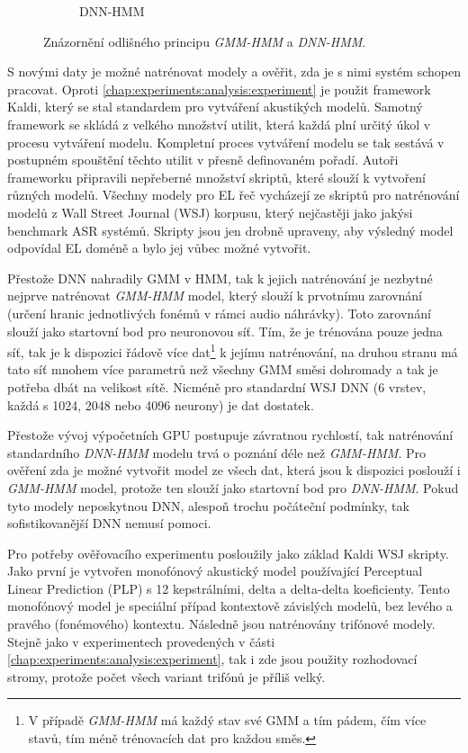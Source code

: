 \begin{figure}[htpb]
\begin{subfigure}[b]{0.4\textwidth}
    \caption{DNN-HMM}
    \label{fig:experiments:normalization:hmm:dnn}
  \end{subfigure}
  \caption{Znázornění odlišného principu \textit{GMM-HMM} a \textit{DNN-HMM}.}
  \label{fig:experiments:normalization:hmm}
\end{figure}

S novými daty je možné natrénovat modely a ověřit, zda je s nimi systém schopen pracovat. Oproti \ref{chap:experiments:analysis:experiment} je použit framework Kaldi, který se stal standardem pro vytváření akustikých modelů. Samotný framework se skládá z velkého množství utilit, která každá plní určitý  úkol v procesu vytváření modelu. Kompletní proces vytváření modelu se tak sestává v postupném spouštění těchto utilit v přesně definovaném pořadí. Autoři frameworku připravili nepřeberné množství skriptů, které slouží k vytvoření různých modelů. Všechny modely pro EL řeč vycházejí ze skriptů pro natrénování modelů z Wall Street Journal (WSJ) korpusu, který nejčastěji jako jakýsi benchmark ASR systémů. Skripty jsou jen drobně upraveny, aby výsledný model odpovídal EL doméně a bylo jej vůbec možné vytvořit.

Přestože DNN nahradily GMM v HMM, tak k jejich natrénování je nezbytné nejprve natrénovat \textit{GMM-HMM} model, který slouží k prvotnímu zarovnání (určení hranic jednotlivých fonémů v rámci audio náhrávky). Toto zarovnání slouží jako startovní bod pro neuronovou síť. Tím, že je trénována pouze jedna síť, tak je k dispozici řádově více dat\footnote{V případě \textit{GMM-HMM} má každý stav své GMM a tím pádem, čím více stavů, tím méně trénovacích dat pro každou směs.} k jejímu natrénování, na druhou stranu má tato síť mnohem více parametrů než všechny GMM směsi dohromady a tak je potřeba dbát na velikost sítě. Nicméně pro standardní WSJ DNN (6 vrstev, každá s 1024, 2048 nebo 4096 neurony) je dat dostatek.

Přestože vývoj výpočetních GPU postupuje závratnou rychlostí, tak natrénování standardního \textit{DNN-HMM} modelu trvá o poznání déle než \textit{GMM-HMM}. Pro ověření zda je možné vytvořit model ze všech dat, která jsou k dispozici poslouží i \textit{GMM-HMM} model, protože ten slouží jako startovní bod pro \textit{DNN-HMM}. Pokud tyto modely neposkytnou DNN, alespoň trochu  počáteční podmínky, tak sofistikovanější DNN nemusí pomoci.

Pro potřeby ověřovacího experimentu posloužily jako základ Kaldi WSJ skripty. Jako první je vytvořen monofónový akustický model používající Perceptual Linear Prediction (PLP) s 12 kepstrálními, delta a delta-delta koeficienty. Tento monofónový model je speciální případ kontextově závislých modelů, bez levého a pravého (fonémového) kontextu. Následně jsou natrénovány trifónové modely. Stejně jako v experimentech provedených v části \ref{chap:experiments:analysis:experiment}, tak i zde jsou použity rozhodovací stromy, protože počet všech variant trifónů je příliš velký.

